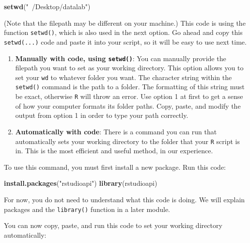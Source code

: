 \documentclass[]{book}
\newenvironment{Shaded}{\begin{snugshade}}{\end{snugshade}}
\newcommand{\KeywordTok}[1]{\textcolor[rgb]{0.13,0.29,0.53}{\textbf{#1}}}
\newcommand{\NormalTok}[1]{#1}
\newcommand{\OperatorTok}[1]{\textcolor[rgb]{0.81,0.36,0.00}{\textbf{#1}}}
\newcommand{\StringTok}[1]{\textcolor[rgb]{0.31,0.60,0.02}{#1}}
\begin{document}
\begin{Shaded}
\begin{Highlighting}[]
\KeywordTok{setwd}\NormalTok{(}\StringTok{"~/Desktop/datalab"}\NormalTok{)}
\end{Highlighting}
\end{Shaded}

(Note that the filepath may be different on your machine.) This code is using the function \texttt{setwd()}, which is also used in the next option. Go ahead and copy this \texttt{setwd(...)} code and paste it into your script, so it will be easy to use next time.

\begin{enumerate}
\def\labelenumi{\arabic{enumi}.}
\setcounter{enumi}{1}
\item
  \textbf{Manually with code, using \texttt{setwd()}}: You can manually provide the filepath you want to set as your working directory. This option allows you to set your \texttt{wd} to whatever folder you want. The character string within the \texttt{setwd()} command is the path to a folder. The formatting of this string must be exact, otherwise \texttt{R} will throw an error. Use option 1 at first to get a sense of how your computer formats its folder paths. Copy, paste, and modify the output from option 1 in order to type your path correctly.
\item
  \textbf{Automatically with code}: There is a command you can run that automatically sets your working directory to the folder that your \texttt{R} script is in. This is the most efficient and useful method, in our experience.
\end{enumerate}

To use this command, you must first install a new package. Run this code:

\begin{Shaded}
\begin{Highlighting}[]
\KeywordTok{install.packages}\NormalTok{(}\StringTok{"rstudioapi"}\NormalTok{)}
\KeywordTok{library}\NormalTok{(rstudioapi)}
\end{Highlighting}
\end{Shaded}

For now, you do not need to understand what this code is doing. We will explain packages and the \texttt{library()} function in a later module.

You can now copy, paste, and run this code to set your working directory automatically:

\begin{Shaded}
\end{Shaded}
\end{document}
